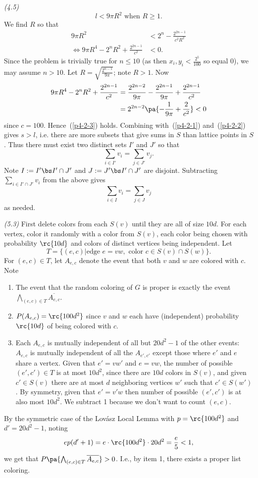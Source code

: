 \begin{problem}{\it (4.5)}
\begin{equation}\label{p4-2-2}
l< 9\pi R^2\text{ when }R\ge 1.
\end{equation}
We find $R$ so that
\begin{align}
\label{p4-2-3}
9\pi R^2&<2^n-\frac{2^{2n-1}}{c^2 R^2}\\
\nonumber
\iff 9\pi R^4-2^nR^2+\frac{2^{2n-1}}{c^2}&<0.
\end{align}
Since the problem is trivially true for $n\le 10$ (as then $x_i,y_i<\frac{2^{5}}{100}$ so equal 0), we may assume $n>10$. 
Let $R=\sqrt{\frac{2^{n-1}}{9\pi}}$; note $R>1$. Now
\begin{align*}
9\pi R^4-2^nR^2+\frac{2^{2n-1}}{c^2}&=\frac{2^{2n-2}}{9\pi}-\frac{2^{2n-1}}{9\pi}+\frac{2^{2n-1}}{c^2}\\
&=2^{2n-2}\pa{-\frac{1}{9\pi}+\frac2{c^2}}<0
\end{align*}
since $c=100$. Hence~(\ref{p4-2-3}) holds. Combining with~(\ref{p4-2-1}) and~(\ref{p4-2-2}) gives $s>l$, i.e. there are more subsets that give sums in $S$ than lattice points in $S$. Thus there must exist two distinct sets $I'$ and $J'$ so that
\[
\sum_{i\in I'} v_i=\sum_{j\in J'} v_j.
\]
Note $I:=I'\bs I'\cap J'$ and $J:=J'\bs I'\cap J'$ are disjoint. 
Subtracting $\sum_{i\in I'\cap J'} v_i$ from the above gives
\[
\sum_{i\in I}v_i=\sum_{j\in J} v_j
\]
as needed.
\end{problem}
\begin{problem} {\it (5.3)}
First delete colors from each $S(v)$ until they are all of size $10d$. For each vertex, color it randomly with a color from $S(v)$, each color being chosen with probability $\rc{10d}$ and colors of distinct vertices being independent. 
Let 
\[T=\{(e,c)|\text{edge }e=vw,\text{ color }c\in S(v)\cap S(w)\}.\]
For $(e,c)\in T$, let $A_{e,c}$ denote the event that both $v$ and $w$ are colored with $c$. Note
\begin{enumerate}
\item The event that the random coloring of $G$ is proper is exactly the event $\bigwedge_{(e,c)\in T} \overline{A_{e,c}}$. 
\item
$P(A_{e,c})=\rc{100d^2}$ since $v$ and $w$ each have (independent) probability $\rc{10d}$ of being colored with $c$. 
\item
Each $A_{e,c}$ is mutually independent of all but $20d^2-1$ of the other events: $A_{e,c}$ is mutually independent of all the $A_{e',c'}$ except those where $e'$ and $e$ share a vertex. Given that $e'=vw'$ and $e=vw$, the number of possible $(e',c')\in T$ is at most $10d^2$, since there are $10d$ colors in $S(v)$, and given $c'\in S(v)$ there are at most $d$ neighboring vertices $w'$ such that $c'\in S(w')$. By symmetry, given that $e'=v'w$ then number of possible $(e',c')$ is at also most $10d^2$. We subtract 1 because we don't want to count $(e,c)$.
\end{enumerate}
By the symmetric case of the Lov\'asz Local Lemma with $p=\rc{100d^2}$ and $d'=20d^2-1$, noting
\[
ep(d'+1)=e\cdot \rc{100d^2}\cdot 20d^2=\frac e5<1,
\] 
we get that $P\pa{\bigwedge_{(e,c)\in T} \overline{A_{e,c}}}>0$. I.e., by item 1, there exists a proper list coloring.
\end{problem}
